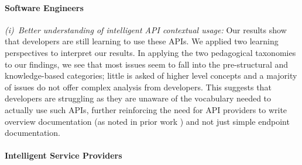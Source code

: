\paragraph{Software Engineers}
\textit{(i)~Better understanding of intelligent API contextual usage:} Our results show that developers are still learning to use these APIs. We applied two learning perspectives to interpret our results. In applying the two pedagogical taxonomies to our findings, we see that most issues seem to fall into the pre-structural and knowledge-based categories; little is asked of higher level concepts and a majority of issues do not offer complex analysis from developers. This suggests that developers are struggling as they are unaware of the vocabulary needed to actually use such APIs, further reinforcing the need for API providers to write overview documentation (as noted in prior work \citep{Cummaudo:2020icse}) and not just simple endpoint documentation. 

\paragraph{Intelligent Service Providers}

